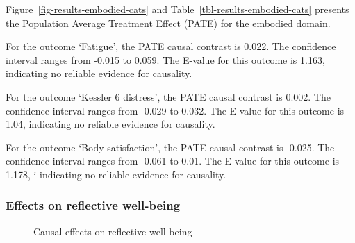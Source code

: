 \documentclass[
  singlecolumn,
  9pt]{article}
\begin{document}
Figure~\ref{fig-results-embodied-cats} and
Table~\ref{tbl-results-embodied-cats} presents the Population Average
Treatment Effect (PATE) for the embodied domain.

For the outcome `Fatigue', the PATE causal contrast is 0.022. The
confidence interval ranges from -0.015 to 0.059. The E-value for this
outcome is 1.163, indicating no reliable evidence for causality.

For the outcome `Kessler 6 distress', the PATE causal contrast is 0.002.
The confidence interval ranges from -0.029 to 0.032. The E-value for
this outcome is 1.04, indicating no reliable evidence for causality.

For the outcome `Body satisfaction', the PATE causal contrast is -0.025.
The confidence interval ranges from -0.061 to 0.01. The E-value for this
outcome is 1.178, i indicating no reliable evidence for causality.

\newpage{}

\subsubsection{Effects on reflective
well-being}\label{effects-on-reflective-well-being}

\begin{figure}


\caption{\label{fig-results-reflective-well-being-cats}Causal effects on
reflective well-being}

\end{figure}%

\newpage{}
\end{document}
